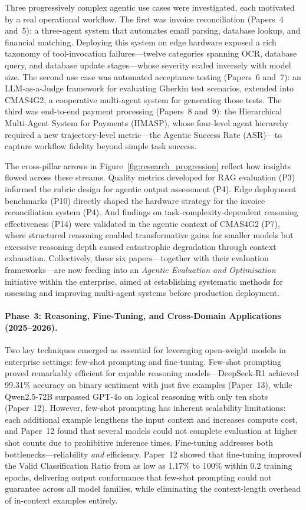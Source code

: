 Three progressively complex agentic use cases were investigated, each motivated by a real operational workflow.  The first was invoice reconciliation (Papers~4 and~5): a three-agent system that automates email parsing, database lookup, and financial matching.  Deploying this system on edge hardware exposed a rich taxonomy of tool-invocation failures---twelve categories spanning OCR, database query, and database update stages---whose severity scaled inversely with model size.  The second use case was automated acceptance testing (Papers~6 and~7): an LLM-as-a-Judge framework for evaluating Gherkin test scenarios, extended into CMAS4G2, a cooperative multi-agent system for generating those tests.  The third was end-to-end payment processing (Papers~8 and~9): the Hierarchical Multi-Agent System for Payments (HMASP), whose four-level agent hierarchy required a new trajectory-level metric---the Agentic Success Rate (ASR)---to capture workflow fidelity beyond simple task success.

The cross-pillar arrows in Figure~\ref{fig:research_progression} reflect how insights flowed across these streams.  Quality metrics developed for RAG evaluation (P3) informed the rubric design for agentic output assessment (P4).  Edge deployment benchmarks (P10) directly shaped the hardware strategy for the invoice reconciliation system (P4).  And findings on task-complexity-dependent reasoning effectiveness (P14) were validated in the agentic context of CMAS4G2 (P7), where structured reasoning enabled transformative gains for smaller models but excessive reasoning depth caused catastrophic degradation through context exhaustion.  Collectively, these six papers---together with their evaluation frameworks---are now feeding into an \emph{Agentic Evaluation and Optimisation} initiative within the enterprise, aimed at establishing systematic methods for assessing and improving multi-agent systems before production deployment.

\paragraph{Phase~3: Reasoning, Fine-Tuning, and Cross-Domain Applications (2025--2026).}
Two key techniques emerged as essential for leveraging open-weight models in enterprise settings: few-shot prompting and fine-tuning.  Few-shot prompting proved remarkably efficient for capable reasoning models---DeepSeek-R1 achieved 99.31\% accuracy on binary sentiment with just five examples (Paper~13), while Qwen2.5-72B surpassed GPT-4o on logical reasoning with only ten shots (Paper~12).  However, few-shot prompting has inherent scalability limitations: each additional example lengthens the input context and increases compute cost, and Paper~12 found that several models could not complete evaluation at higher shot counts due to prohibitive inference times.  Fine-tuning addresses both bottlenecks---reliability \emph{and} efficiency.  Paper~12 showed that fine-tuning improved the Valid Classification Ratio from as low as 1.17\% to 100\% within 0.2 training epochs, delivering output conformance that few-shot prompting could not guarantee across all model families, while eliminating the context-length overhead of in-context examples entirely.


